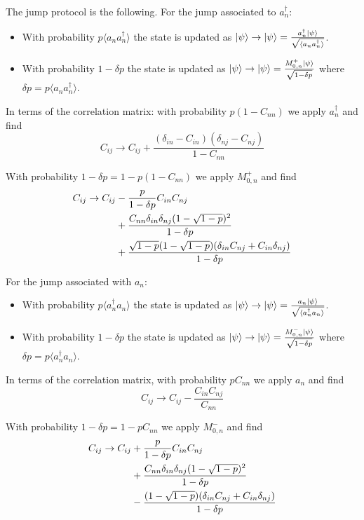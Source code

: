 \documentclass[reprint, superscriptaddress, aps, prl]{revtex4-2}
\begin{document}
The jump protocol is the following.
For the jump associated to $a_n^{\dagger}$:
\begin{itemize}
    \item With probability $p\langle a_na_n^{\dagger}\rangle$ the state is updated as $\ket{\psi}\rightarrow\ket{\psi}=\frac{a_n^{\dagger}\ket{\psi}}{\sqrt{\langle a_na_n^{\dagger}\rangle}}$.
    \item With probability $1-\delta p$ the state is updated as $\ket{\psi}\rightarrow\ket{\psi}=\frac{M^+_{0,n}\ket{\psi}}{\sqrt{1-\delta p}}$ where $\delta p=p\langle a_na_n^{\dagger}\rangle$.
\end{itemize}

In terms of the correlation matrix: with probability $p(1-C_{nn})$ we apply $a_n^{\dagger}$ and find
\begin{equation}
    C_{ij} \rightarrow C_{ij}+\frac{(\delta_{in}-C_{in})(\delta_{nj}-C_{nj})}{1-C_{nn}}
\end{equation}

With probability $1-\delta p=1-p(1-C_{nn})$ we apply $M^+_{0,n}$ and find
\begin{align}
C_{ij}\rightarrow C_{ij} &- \frac{p}{1-\delta p}C_{in}C_{nj} \\
                  \notag &+ \frac{C_{nn}\delta_{in}\delta_{nj}(1-\sqrt{1-p})^2}{1-\delta p} \\
                  \notag &+ \frac{\sqrt{1-p}(1-\sqrt{1-p})(\delta_{in}C_{nj}+C_{in}\delta_{nj})}{1-\delta p}
\end{align}

For the jump associated with $a_n$:
\begin{itemize}
    \item With probability $p\langle a_n^{\dagger}a_n\rangle$ the state is updated as $\ket{\psi}\rightarrow\ket{\psi}=\frac{a_n\ket{\psi}}{\sqrt{\langle a_n^{\dagger}a_n\rangle}}$.
    \item With probability $1-\delta p$ the state is updated as $\ket{\psi}\rightarrow\ket{\psi}=\frac{M^-_{0,n}\ket{\psi}}{\sqrt{1-\delta p}}$ where $\delta p=p\langle a_n^{\dagger}a_n\rangle$.
\end{itemize}

In terms of the correlation matrix, with probability $pC_{nn}$ we apply $a_n$ and find
\begin{equation}
C_{ij} \rightarrow C_{ij}-\frac{C_{in}C_{nj}}{C_{nn}}
\end{equation}

With probability $1-\delta p=1-pC_{nn}$ we apply $M^-_{0,n}$ and find
\begin{align}
C_{ij}\rightarrow C_{ij} &+ \frac{p}{1-\delta p}C_{in}C_{nj} \\
                  \notag &+ \frac{C_{nn}\delta_{in}\delta_{nj}(1-\sqrt{1-p})^2}{1-\delta p} \\
                  \notag &- \frac{(1-\sqrt{1-p})(\delta_{in}C_{nj}+C_{in}\delta_{nj})}{1-\delta p}
\end{align}
\end{document}
